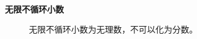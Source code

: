 \begin{paracol}{2}
\begin{description}
\item [{\bf 无限不循环小数}] 无限不循环小数为无理数，不可以化为分数。
\end{description}
\end{paracol}

\newpage
